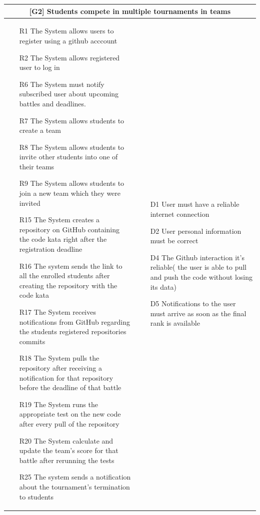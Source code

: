 \begin{enumerate}[label=\textbf{[UC\arabic*]}]
\begin{tabular}{|p{7cm}|p{7cm}|}
\hline
\multicolumn{2}{|c|}{
\textbf{[G2] Students compete in multiple tournaments in teams} }
\\
\hline
\begin{itemize}
    \item [R1] The System allows users to register using a github acccount
    \item [R2] The System allows registered user to log in
    \item [R6] The System must notify subscribed user about upcoming battles and deadlines.
    \item [R7] The System allows students to create a team
    \item [R8] The System allows students to invite other students into one of their teams
    \item [R9] The System allows students to join a new team which they were invited
    \item [R15] The System creates a repository on GitHub containing the code kata right after the registration deadline
    \item [R16] The system sends the link to all the enrolled students after creating the repository with the code kata
    \item [R17] The System receives notifications from GitHub regarding the students registered repositories commits
    \item [R18] The System pulls the repository after receiving a notification for that repository before the deadline of that battle
    \item [R19] The System runs the appropriate test on the new code after every pull of the repository
    \item [R20] The System calculate and update the team's score for that battle after rerunning the tests
    \item [R25] The system  sends a notification about the tournament's termination to students
\end{itemize}
&
\begin{itemize}
    \item [D1] User must have a reliable internet connection
    \item [D2] User personal information must be correct
    \item [D4] The Github interaction it's reliable( the user is able to pull and push the code without losing its data)
    \item [D5] Notifications to the user must arrive as soon as the final rank is available
\end{itemize}
\\
\hline
\end{tabular}


\end{enumerate}
